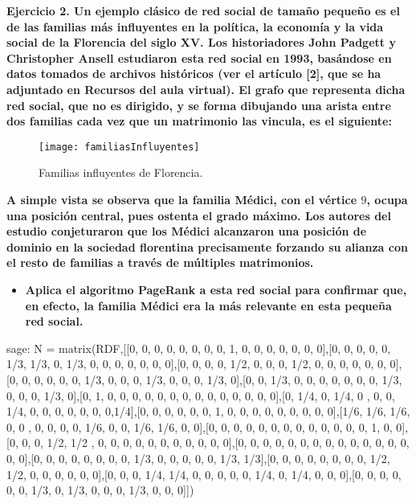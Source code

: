 
\begin{ejer}
    \textbf{Ejercicio 2. Un ejemplo clásico de red social de tamaño pequeño es el de las familias 
    más influyentes en la política, la economía y la vida social de la Florencia del siglo XV. 
    Los historiadores John Padgett y Christopher Ansell estudiaron esta red social en 1993, 
    basándose en datos tomados de archivos históricos (ver el artículo [2], que se ha adjuntado en 
    Recursos del aula virtual). El grafo que representa dicha red social, que no es dirigido, 
    y se forma dibujando una arista entre dos familias cada vez que un matrimonio las vincula, es el siguiente:}
\end{ejer}
 \begin{figure}[H]
	\texttt{[image: familiasInfluyentes]}
	\centering
	\caption{Familias influyentes de Florencia.}
    \label{fig:familiasInfluyentes}
\end{figure}
\begin{ejer}
    \textbf{A simple vista se observa que la familia Médici, con el vértice $9$, ocupa una posición central, pues ostenta el grado máximo. 
    Los autores del estudio conjeturaron que los Médici alcanzaron una posición de dominio en la sociedad florentina precisamente forzando 
    su alianza con el resto de familias a través de múltiples matrimonios.}
\end{ejer}
\begin{ejer}
    \begin{itemize}
        \item \textbf{Aplica el algoritmo PageRank a esta red social para confirmar que, en efecto, la familia Médici era la más relevante en esta pequeña red social.}
    \end{itemize}
\end{ejer}
\begin{sagecommandline}
    sage: N = matrix(RDF,[[0, 0, 0, 0, 0, 0, 0, 0, 1, 0, 0, 0, 0, 0, 0, 0],[0, 0, 0, 0, 0, 1/3, 1/3, 0, 1/3, 0, 0, 0, 0, 0, 0, 0],[0, 0, 0, 0, 1/2, 0, 0, 0, 1/2, 0, 0, 0, 0, 0, 0, 0],[0, 0, 0, 0, 0, 0, 1/3, 0, 0, 0, 1/3, 0, 0, 0, 1/3, 0],[0, 0, 1/3, 0, 0, 0, 0, 0, 0, 0, 1/3, 0, 0, 0, 1/3, 0],[0, 1, 0, 0, 0, 0, 0, 0, 0, 0, 0, 0, 0, 0, 0, 0],[0, 1/4, 0, 1/4, 0 , 0, 0, 1/4, 0, 0, 0, 0, 0, 0, 0,1/4],[0, 0, 0, 0, 0, 0, 1, 0, 0, 0, 0, 0, 0, 0, 0, 0],[1/6, 1/6, 1/6, 0, 0 , 0, 0, 0, 0, 1/6, 0, 0, 1/6, 1/6, 0, 0],[0, 0, 0, 0, 0, 0, 0, 0, 0, 0, 0, 0, 0, 1, 0, 0],[0, 0, 0, 1/2, 1/2 , 0, 0, 0, 0, 0, 0, 0, 0, 0, 0, 0],[0, 0, 0, 0, 0, 0, 0, 0, 0, 0, 0, 0, 0, 0, 0, 0],[0, 0, 0, 0, 0, 0, 0, 0, 1/3, 0, 0, 0, 0, 0, 1/3, 1/3],[0, 0, 0, 0, 0, 0, 0, 0, 1/2, 1/2, 0, 0, 0, 0, 0, 0],[0, 0, 0, 1/4, 1/4, 0, 0, 0, 0, 0, 1/4, 0, 1/4, 0, 0, 0],[0, 0, 0, 0, 0, 0, 1/3, 0, 1/3, 0, 0, 0, 1/3, 0, 0, 0]])
\end{sagecommandline}
